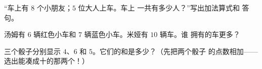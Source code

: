 \begin{exercise}[$\star$]\label{exo:g1:addition:7}
“车上有 $8$ 个小朋友；$5$ 位大人上车。车上
一共有多少人？”写出加法算式和
答句。
\end{exercise}

\begin{exercise}[$\star$]\label{exo:g1:addition:8}
汤姆有 $6$ 辆红色小车和 $7$ 辆蓝色小车。米娅有 $10$ 辆车。谁
拥有的车更多？
\end{exercise}

\begin{exercise}[$\star\star$]\label{exo:g1:addition:9}
三个骰子分别显示 $4$、$6$ 和 $5$。它们的和是多少？（先把两个骰子
的点数相加——选出能凑成十的那两个！）
\end{exercise}
